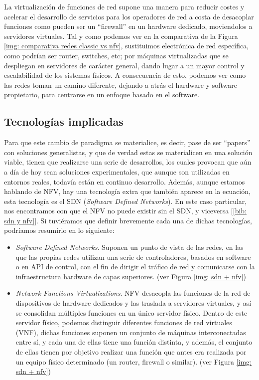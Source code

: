 \documentclass[12pt]{article}
\begin{document}
	\noindent La virtualización de funciones de red supone una manera para reducir costes y acelerar el desarrollo de servicios para los operadores de red a costa de desacoplar funciones como pueden ser un ``firewall'' en un hardware dedicado, moviendolos a servidores virtuales. Tal y como podemos ver en la comparativa de la Figura \ref{img: comparativa redes classic vs nfv}, sustituimos electrónica de red específica, como podrían ser router, switches, etc; por máquinas virtualizadas que se despliegan en servidores de carácter general, dando lugar a un mayor control y escalabilidad de los sistemas físicos. A consecuencia de esto, podemos ver como las redes toman un camino diferente, dejando a atrás el hardware y software propietario, para centrarse en un enfoque basado en el software. \\
	
	\pagebreak
	
	\subsection{Tecnologías implicadas}
	\noindent Para que este cambio de paradigma se materialice, es decir, pase de ser ``papers'' con soluciones generalistas, y que de verdad estas se materialicen en una solución viable, tienen que realizarse una serie de desarrollos, los cuales provocan que aún a día de hoy sean soluciones experimentales, que aunque son utilizadas en entornos reales, todavía están en continuo desarrollo. Además, aunque estamos hablando de NFV, hay una tecnología extra que también aparece en la ecuación, esta tecnología es el SDN (\textit{Software Defined Networks}). En este caso particular, nos encontramos con que el NFV no puede existir sin el SDN, y viceversa [\ref{bib: sdn y nfv}]. Si tuviéramos que definir brevemente cada una de dichas tecnologías, podríamos resumirlo en lo siguiente:
	\begin{itemize}
		\item \textit{Software Defined Networks}. Suponen un punto de vista de las redes, en las que las propias redes utilizan una serie de controladores, basados en software o en API de control, con el fin de dirigir el tráfico de red y comunicarse con la infraestructura hardware de capas superiores. (ver Figura \ref{img: sdn + nfv})
		 
		\item \textit{Network Functions Virtualizations}. NFV desacopla las funciones de la red de dispositivos de hardware dedicados y las traslada a servidores virtuales, y así se consolidan múltiples funciones en un único servidor físico. Dentro de este servidor físico, podemos distinguir diferentes funciones de red virtuales (VNF), dichas funciones suponen un conjunto de máquinas interconectadas entre sí, y cada una de ellas tiene una función distinta, y además, el conjunto de ellas tienen por objetivo realizar una función que antes era realizada por un equipo físico determinado (un router, firewall o similar). (ver Figura \ref{img: sdn + nfv})
	\end{itemize}
\end{document}

